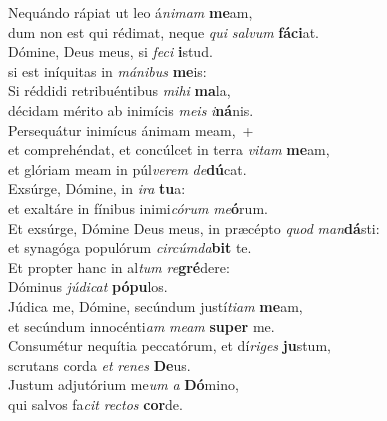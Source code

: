 \evenverse Nequándo rápiat ut leo á\textit{ni}\textit{mam} \textbf{me}am,~\*\\
\evenverse dum non est qui rédimat, neque \textit{qui} \textit{sal}\textit{vum} \textbf{fá}\textbf{ci}at.\\
\oddverse Dómine, Deus meus, si \textit{fe}\textit{ci} \textbf{i}stud.~\*\\
\oddverse si est iníquitas in \textit{má}\textit{ni}\textit{bus} \textbf{me}is:\\
\evenverse Si réddidi retribuéntibus \textit{mi}\textit{hi} \textbf{ma}la,~\*\\
\evenverse décidam mérito ab inimícis \textit{me}\textit{is} \textit{i}\textbf{ná}nis.\\
\oddverse Persequátur inimícus ánimam meam,~+\\
\oddverse  et comprehéndat, et concúlcet in terra \textit{vi}\textit{tam} \textbf{me}am,~\*\\
\oddverse et glóriam meam in púl\textit{ve}\textit{rem} \textit{de}\textbf{dú}cat.\\
\evenverse Exsúrge, Dómine, in \textit{i}\textit{ra} \textbf{tu}a:~\*\\
\evenverse et exaltáre in fínibus inimi\textit{có}\textit{rum} \textit{me}\textbf{ó}rum.\\
\oddverse Et exsúrge, Dómine Deus meus, in præcépto \textit{quod} \textit{man}\textbf{dá}sti:~\*\\
\oddverse et synagóga populórum \textit{cir}\textit{cúm}\textit{da}\textbf{bit} te.\\
\evenverse Et propter hanc in al\textit{tum} \textit{re}\textbf{gré}dere:~\*\\
\evenverse Dóminus \textit{jú}\textit{di}\textit{cat} \textbf{pó}\textbf{pu}los.\\
\oddverse Júdica me, Dómine, secúndum justí\textit{ti}\textit{am} \textbf{me}am,~\*\\
\oddverse et secúndum innocénti\textit{am} \textit{me}\textit{am} \textbf{su}\textbf{per} me.\\
\evenverse Consumétur nequítia peccatórum, et dí\textit{ri}\textit{ges} \textbf{ju}stum,~\*\\
\evenverse scrutans corda \textit{et} \textit{re}\textit{nes} \textbf{De}us.\\
\oddverse Justum adjutórium me\textit{um} \textit{a} \textbf{Dó}mino,~\*\\
\oddverse qui salvos fa\textit{cit} \textit{re}\textit{ctos} \textbf{cor}de.\\
